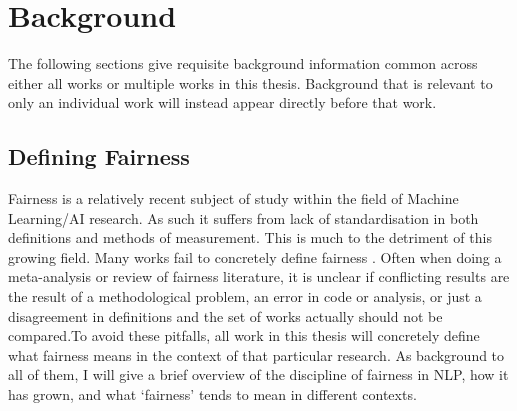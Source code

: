 \chapter{Background}\label{chapter:background}

The following sections give requisite background information common across either all works or multiple works in this thesis. Background that is relevant to only an individual work will instead appear directly before that work.

\section{Defining Fairness}
Fairness is a relatively recent subject of study within the field of Machine Learning/AI research. As such it suffers from lack of standardisation in both definitions and methods of measurement. This is much to the detriment of this growing field. Many works fail to concretely define fairness \citep{blodgett-etal-2020-language, goldfarb-tarrant-etal-2023-prompt}. Often when doing a meta-analysis or review of fairness literature, it is unclear if conflicting results are the result of a methodological problem, an error in code or analysis, or just a disagreement in definitions and the set of works actually should not be compared.To avoid these pitfalls, all work in this thesis will concretely define what fairness means in the context of that particular research. As background to all of them, I will give a brief overview of the discipline of fairness in NLP, how it has grown, and what `fairness' tends to mean in different contexts. 
